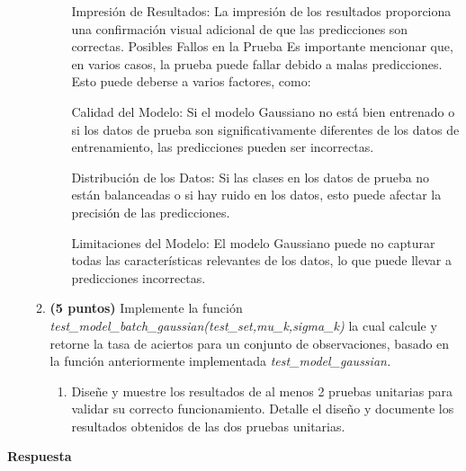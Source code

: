 \documentclass[spanish]{article}
\begin{document}
\begin{enumerate}
\begin{enumerate}
\begin{enumerate}
\par Impresión de Resultados: La impresión de los resultados proporciona una confirmación visual adicional de que las predicciones son correctas.
Posibles Fallos en la Prueba
Es importante mencionar que, en varios casos, la prueba puede fallar debido a malas predicciones. Esto puede deberse a varios factores, como:
\vspace{5px}

\par Calidad del Modelo: Si el modelo Gaussiano no está bien entrenado o si los datos de prueba son significativamente diferentes de los datos de entrenamiento, las predicciones pueden ser incorrectas.
\vspace{5px}

\par Distribución de los Datos: Si las clases en los datos de prueba no están balanceadas o si hay ruido en los datos, esto puede afectar la precisión de las predicciones.
\vspace{5px}

\par Limitaciones del Modelo: El modelo Gaussiano puede no capturar todas las características relevantes de los datos, lo que puede llevar a predicciones incorrectas.


\end{enumerate}
\item \textbf{(5 puntos)} Implemente la función \emph{test\_model\_batch\_gaussian(test\_set,mu\_k,sigma\_k)
}la cual calcule y retorne la tasa de aciertos para un conjunto de
observaciones, basado en la función anteriormente implementada \emph{test\_model\_gaussian.}
\begin{enumerate}
\item Diseñe y muestre los resultados de al menos 2 pruebas unitarias para
validar su correcto funcionamiento. Detalle el diseño y documente
los resultados obtenidos de las dos pruebas unitarias.
\end{enumerate}
\end{enumerate}
\end{enumerate}

\vspace{5px}
\textbf{Respuesta}
\vspace{5px}
\end{document}
